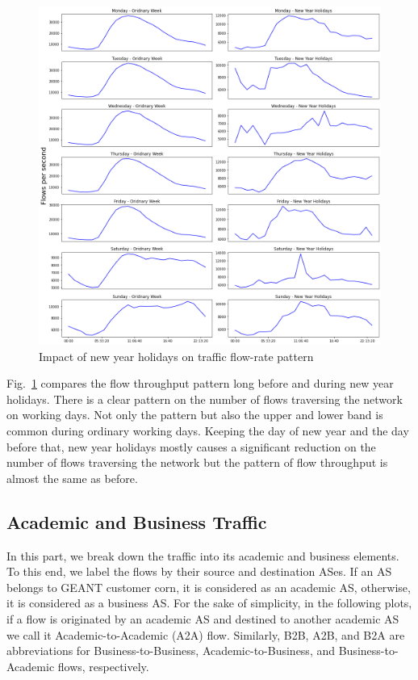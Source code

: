 \documentclass[10pt, journal, letterpaper]{IEEEtran}
\begin{document}
\begin{figure}
    \centering
    \includegraphics[width=\columnwidth]{img/BCH_CH2_hourly_compare_fps.png}
    \caption{Impact of new year holidays on traffic flow-rate pattern}
    \label{fig:BCH_CH2_hourly_fps}
\end{figure}
Fig.~\ref{fig:BCH_CH2_hourly_fps} compares the flow throughput pattern long before and during new year holidays. There is a clear pattern on the number of flows traversing the network on working days. Not only the pattern but also the upper and lower band is common during ordinary working days. Keeping the day of new year and the day before that, new year holidays mostly causes a significant reduction on the number of flows traversing the network but the pattern of flow throughput is almost the same as before. 

\subsection{Academic and Business Traffic}
In this part, we break down the traffic into its academic and business elements. To this end, we label the flows by their source and destination ASes. If an AS belongs to GEANT customer corn, it is considered as an academic AS, otherwise, it is considered as a business AS. For the sake of simplicity, in the following plots, if a flow is originated by an academic AS and destined to another academic AS we call it Academic-to-Academic (A2A) flow. Similarly, B2B, A2B, and B2A are abbreviations for Business-to-Business, Academic-to-Business, and Business-to-Academic flows, respectively.
\end{document}
